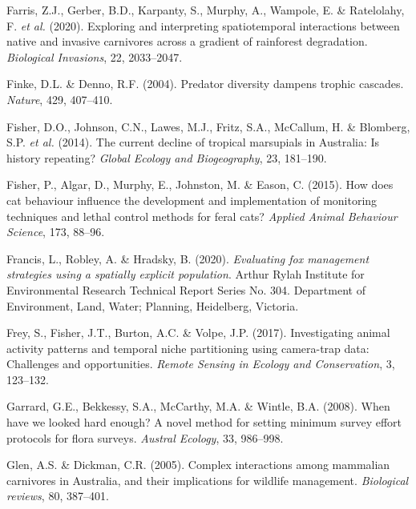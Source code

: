 \documentclass[11pt,a4paper,titlepage,twoside,openright]{style/unimelbthesis}
\begin{document}
\begin{mainmatter}
\leavevmode\hypertarget{ref-farris2020exploring}{}%
Farris, Z.J., Gerber, B.D., Karpanty, S., Murphy, A., Wampole, E. \& Ratelolahy, F. \emph{et al.} (2020). Exploring and interpreting spatiotemporal interactions between native and invasive carnivores across a gradient of rainforest degradation. \emph{Biological Invasions}, 22, 2033--2047.

\leavevmode\hypertarget{ref-finke2004predator}{}%
Finke, D.L. \& Denno, R.F. (2004). Predator diversity dampens trophic cascades. \emph{Nature}, 429, 407--410.

\leavevmode\hypertarget{ref-fisher2014current}{}%
Fisher, D.O., Johnson, C.N., Lawes, M.J., Fritz, S.A., McCallum, H. \& Blomberg, S.P. \emph{et al.} (2014). The current decline of tropical marsupials in Australia: Is history repeating? \emph{Global Ecology and Biogeography}, 23, 181--190.

\leavevmode\hypertarget{ref-fisher2015cat}{}%
Fisher, P., Algar, D., Murphy, E., Johnston, M. \& Eason, C. (2015). How does cat behaviour influence the development and implementation of monitoring techniques and lethal control methods for feral cats? \emph{Applied Animal Behaviour Science}, 173, 88--96.

\leavevmode\hypertarget{ref-francis2020evaluating}{}%
Francis, L., Robley, A. \& Hradsky, B. (2020). \emph{Evaluating fox management strategies using a spatially explicit population}. Arthur Rylah Institute for Environmental Research Technical Report Series No. 304. Department of Environment, Land, Water; Planning, Heidelberg, Victoria.

\leavevmode\hypertarget{ref-frey2017investigating}{}%
Frey, S., Fisher, J.T., Burton, A.C. \& Volpe, J.P. (2017). Investigating animal activity patterns and temporal niche partitioning using camera-trap data: Challenges and opportunities. \emph{Remote Sensing in Ecology and Conservation}, 3, 123--132.

\leavevmode\hypertarget{ref-https:ux2fux2fdoi.orgux2f10.1111ux2fj.1442-9993.2008.01869.x}{}%
Garrard, G.E., Bekkessy, S.A., McCarthy, M.A. \& Wintle, B.A. (2008). When have we looked hard enough? A novel method for setting minimum survey effort protocols for flora surveys. \emph{Austral Ecology}, 33, 986--998.

\leavevmode\hypertarget{ref-glen2005complex}{}%
Glen, A.S. \& Dickman, C.R. (2005). Complex interactions among mammalian carnivores in Australia, and their implications for wildlife management. \emph{Biological reviews}, 80, 387--401.


\end{mainmatter}
\end{document}
